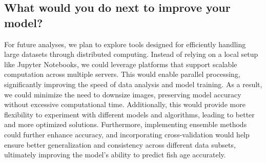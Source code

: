 \subsection{What would you do next to improve your model?}

For future analyses, we plan to explore tools designed for efficiently handling large datasets through distributed computing.
Instead of relying on a local setup like Jupyter Notebooks, we could leverage platforms that support scalable computation across multiple servers.
This would enable parallel processing, significantly improving the speed of data analysis and model training.
As a result, we could minimize the need to downsize images, preserving model accuracy without excessive computational time.
Additionally, this would provide more flexibility to experiment with different models and algorithms, leading to better and more optimized solutions.
Furthermore, implementing ensemble methods could further enhance accuracy, and incorporating cross-validation would help ensure better generalization and consistency across different data subsets, ultimately improving the model's ability to predict fish age accurately.


